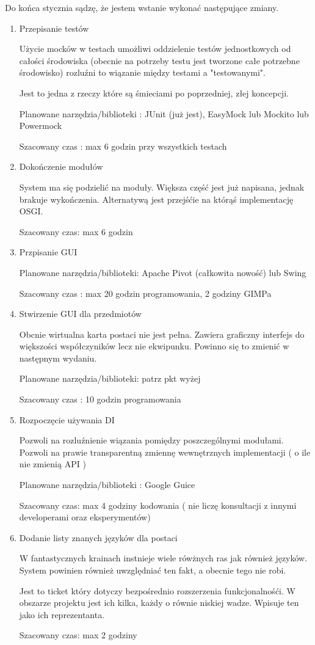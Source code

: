 \documentclass[16pt]{article}
\begin{document}
Do końca stycznia sądzę, że jestem wstanie wykonać następujące zmiany.
\begin{enumerate}
\item{Przepisanie testów}

Użycie mocków w testach umożliwi oddzielenie testów jednostkowych od całości środowiska
(obecnie na potrzeby testu jest tworzone całe potrzebne środowisko) rozluźni to wiązanie między testami a "testowanymi". 

Jest to jedna z rzeczy które są śmieciami po poprzedniej, złej koncepcji.


Planowane narzędzia/biblioteki : JUnit (już jest), EasyMock lub Mockito lub Powermock

Szacowany czas : max 6 godzin przy wszystkich testach

\item{Dokończenie modułów}

System ma się podzielić na moduły. Większa część jest już napisana, jednak brakuje wykończenia. Alternatywą jest przejśćie na którąś implementację OSGI.

Szacowany czas: max 6 godzin

\item{Przpisanie GUI}

Planowane narzędzia/biblioteki: Apache Pivot (całkowita nowość) lub Swing

Szacowany czas : max 20 godzin programowania, 2 godziny GIMPa

\item{Stwirzenie GUI dla przedmiotów}

Obcnie wirtualna karta postaci nie jest pełna. Zawiera graficzny interfejs do większości współczyników lecz nie ekwipunku. Powinno się to zmienić w następnym wydaniu.

Planowane narzędzia/biblioteki: patrz pkt wyżej

Szacowany czas : 10 godzin programowania

\item{Rozpoczęcie używania DI}

Pozwoli na rozluźnienie wiązania pomiędzy poszczególnymi modułami. Pozwoli na prawie transparentną zmiennę wewnętrznych implementacji ( o ile nie zmienią API )

Planowane narzędzia/biblioteki : Google Guice

Szacowany czas: max 4 godziny kodowania ( nie liczę konsultacji z innymi developerami oraz eksperymentów)

\item{Dodanie listy znanych języków dla postaci}

W fantastycznych krainach instnieje wiele rówżnych ras jak również języków. System powinien również uwzględniać ten fakt, a obecnie tego nie robi.

Jest to ticket który dotyczy bezpośrednio rozszerzenia funkcjonalnośći. W obszarze projektu jest ich kilka, każdy o równie niskiej wadze. Wpisuje ten jako ich reprezentanta.

Szacowany czas: max 2 godziny

\end{enumerate}
\end{document}
